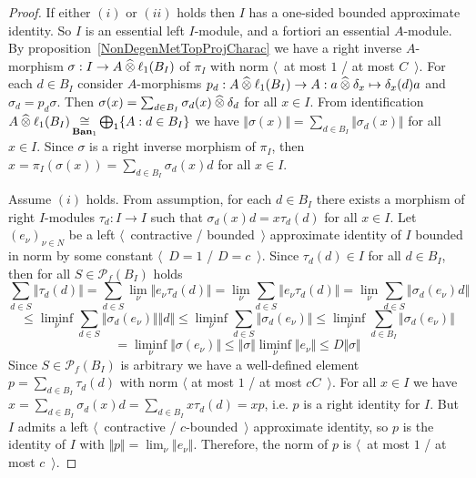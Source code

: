 \begin{proof} If either $(i)$ or $(ii)$ holds then $I$ has a one-sided bounded
approximate identity. So $I$ is an essential left $I$-module, and a fortiori an
essential $A$-module. By proposition~\ref{NonDegenMetTopProjCharac} we have a
right inverse $A$-morphism $\sigma:I\to A\mathbin{\widehat{\otimes}} \ell_1(B_I)$ of $\pi_I$ with
norm  $\langle$~at most $1$ / at most $C$~$\rangle$. For each $d\in B_I$
consider $A$-morphisms $p_d:A\mathbin{\widehat{\otimes}} \ell_1(B_I)\to A:a\mathbin{\widehat{\otimes}}
\delta_x\mapsto \delta_x(d)a$ and $\sigma_d=p_d\sigma$. Then
$\sigma(x)=\sum_{d\in B_I}\sigma_d(x)\mathbin{\widehat{\otimes}} \delta_d$ for all $x\in I$. From
identification 
$A\mathbin{\widehat{\otimes}}\ell_1(B_I)\mathop{\mathbin{\cong}}\limits_{\mathbf{Ban}_1}\bigoplus_1 \{A:d\in B_I \}$ 
we have $\Vert\sigma(x)\Vert=\sum_{d\in B_I} \Vert\sigma_d(x)\Vert$ for
all $x\in I$. Since $\sigma$ is a right inverse morphism of $\pi_I$, then
$x=\pi_I(\sigma(x))=\sum_{d\in B_I}\sigma_d(x)d$ for all $x\in I$. 

Assume $(i)$ holds. From assumption, for each $d\in B_I$ there exists a morphism
of right $I$-modules $\tau_d:I\to I$ such that $\sigma_d(x)d=x\tau_d(d)$ for all
$x\in I$.  Let ${(e_\nu)}_{\nu\in N}$ be a left $\langle$~contractive /
bounded~$\rangle$ approximate identity of $I$ bounded in norm by some constant
$\langle$~$D=1$ / $D=c$~$\rangle$. Since $\tau_d(d)\in I$ for all $d\in B_I$,
then for all $S\in\mathcal{P}_{f}(B_I)$ holds
$$
\sum_{d\in S}\Vert \tau_d(d)\Vert
=\sum_{d\in S}\lim_{\nu}\Vert e_\nu \tau_d(d) \Vert
=\lim_{\nu}\sum_{d\in S}\Vert e_\nu \tau_d(d)\Vert
=\lim_{\nu}\sum_{d\in S}\Vert \sigma_d(e_\nu)d \Vert
$$
$$
\leq\liminf_{\nu}\sum_{d\in S}\Vert\sigma_d(e_\nu)\Vert\Vert d\Vert 
\leq\liminf_{\nu}\sum_{d\in S}\Vert\sigma_d(e_\nu)\Vert
\leq\liminf_{\nu}\sum_{d\in B_I}\Vert\sigma_d(e_\nu)\Vert
$$
$$
=\liminf_{\nu}\Vert\sigma(e_\nu)\Vert
\leq\Vert\sigma\Vert\liminf_{\nu}\Vert e_\nu\Vert
\leq D\Vert\sigma\Vert 
$$
Since $S\in \mathcal{P}_{f}(B_I)$ is arbitrary we have a well-defined element
$p=\sum_{d\in B_I}\tau_d(d)$ with norm $\langle$ at most $1$ / at most
$cC$~$\rangle$. For all $x\in I$ we have $x=\sum_{d\in
B_I}\sigma_d(x)d=\sum_{d\in B_I}x\tau_d(d)=xp$, i.e. $p$ is a right identity for
$I$. But $I$ admits a left $\langle$~contractive / $c$-bounded~$\rangle$
approximate identity, so $p$ is the identity of $I$ with $\Vert
p\Vert=\lim_\nu\Vert e_\nu\Vert$. Therefore, the norm of $p$ is $\langle$~at most
$1$ / at most $c$~$\rangle$.


\end{proof}
